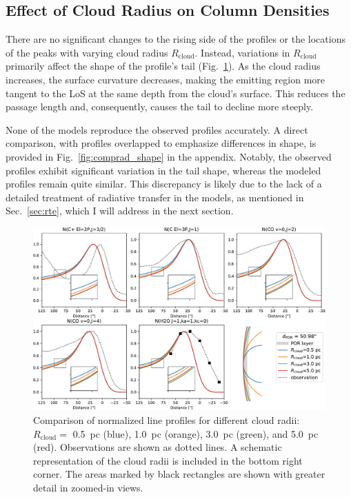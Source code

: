 \documentclass[12pt,a4paper]{article}
\newcommand{\mr}{\mathrm}
\begin{document}
\subsection{Effect of Cloud Radius on Column Densities} \label{sec:comprad}

There are no significant changes to the rising side of the profiles or the locations of the peaks with varying cloud radius $R_\mr{cloud}$. Instead, variations in $R_\mr{cloud}$ primarily affect the shape of the profile's tail (Fig.~\ref{fig:comprad}). As the cloud radius increases, the surface curvature decreases, making the emitting region more tangent to the LoS at the same depth from the cloud's surface. This reduces the passage length and, consequently, causes the tail to decline more steeply.

None of the models reproduce the observed profiles accurately. A direct comparison, with profiles overlapped to emphasize differences in shape, is provided in Fig.~\ref{fig:comprad_shape} in the appendix. Notably, the observed profiles exhibit significant variation in the tail shape, whereas the modeled profiles remain quite similar. This discrepancy is likely due to the lack of a detailed treatment of radiative transfer in the models, as mentioned in Sec.~\ref{sec:rte}, which I will address in the next section.

\begin{figure}[h]
    \centering
    \includegraphics[width=\textwidth,keepaspectratio]{comp_cloud_radius.pdf}
    \caption{Comparison of normalized line profiles for different cloud radii: $R_\mr{cloud} = $ \qty{0.5}{pc} (blue), \qty{1.0}{pc} (orange), \qty{3.0}{pc} (green), and \qty{5.0}{pc} (red). Observations are shown as dotted lines. A schematic representation of the cloud radii is included in the bottom right corner. The areas marked by black rectangles are shown with greater detail in zoomed-in views.} \label{fig:comprad}
\end{figure}
\end{document}
